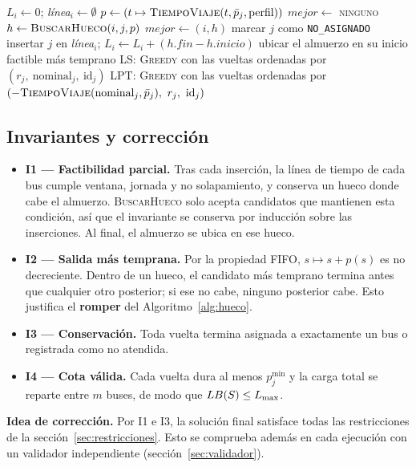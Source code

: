 \begin{algorithm}[H]
\caption{List Scheduling y LPT}\label{alg:greedy}
\begin{algorithmic}[1]
   \State $L_i \gets 0$;\; \textit{línea}$_i \gets \emptyset$ \EndFor
    \State $p \gets (t \mapsto \textsc{TiempoViaje}(t, \bar{p}_j, \text{perfil}))$
    \State $\mathit{mejor} \gets$ \textsc{ninguno}
      \State $h \gets \textsc{BuscarHueco}(i, j, p)$
       \State $\mathit{mejor} \gets (i, h)$ \EndIf
    \EndFor
     \State marcar $j$ como \texttt{NO\_ASIGNADO}
    \Else \State insertar $j$ en \textit{línea}$_i$;\; $L_i \gets L_i + (h.\mathit{fin} - h.\mathit{inicio})$
    \EndIf
  \EndFor
   \State ubicar el almuerzo en su inicio factible más temprano \EndFor
\EndFunction
\Statex
\State \textsc{LS}: \textsc{Greedy} con las vueltas ordenadas por $(r_j,\ \text{nominal}_j,\ \text{id}_j)$
\State \textsc{LPT}: \textsc{Greedy} con las vueltas ordenadas por $(-\textsc{TiempoViaje}(\text{nominal}_j, \pbar_j),\ r_j,\ \text{id}_j)$
\end{algorithmic}
\end{algorithm}

\subsection{Invariantes y corrección}\label{sec:invariantes}
\begin{itemize}
  \item \textbf{I1 — Factibilidad parcial.} Tras cada inserción, la línea de tiempo de cada bus cumple ventana, jornada y no solapamiento, y conserva un hueco donde cabe el almuerzo. \textsc{BuscarHueco} solo acepta candidatos que mantienen esta condición, así que el invariante se conserva por inducción sobre las inserciones. Al final, el almuerzo se ubica en ese hueco.
  \item \textbf{I2 — Salida más temprana.} Por la propiedad FIFO, $s \mapsto s + p(s)$ es no decreciente. Dentro de un hueco, el candidato más temprano termina antes que cualquier otro posterior; si ese no cabe, ninguno posterior cabe. Esto justifica el \textbf{romper} del Algoritmo~\ref{alg:hueco}.
  \item \textbf{I3 — Conservación.} Toda vuelta termina asignada a exactamente un bus o registrada como no atendida.
  \item \textbf{I4 — Cota válida.} Cada vuelta dura al menos $p^{\min}_j$ y la carga total se reparte entre $m$ buses, de modo que $LB(S) \le L_{\max}$.
\end{itemize}
\textbf{Idea de corrección.} Por I1 e I3, la solución final satisface todas las restricciones de la sección~\ref{sec:restricciones}. Esto se comprueba además en cada ejecución con un validador independiente (sección~\ref{sec:validador}).

